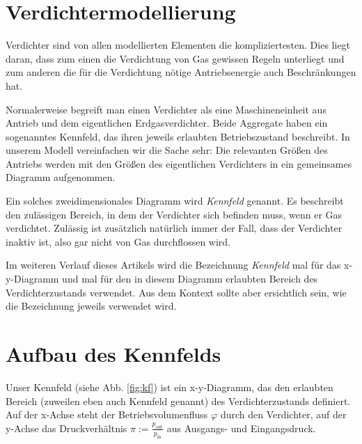 \documentclass{article}
\begin{document}
\section*{Verdichtermodellierung}

Verdichter sind von allen modellierten Elementen die kompliziertesten. Dies liegt daran, dass zum einen die Verdichtung von Gas gewissen Regeln unterliegt und zum anderen die für die Verdichtung nötige Antriebsenergie auch Beschränkungen hat. 

Normalerweise begreift man einen Verdichter als eine Maschineneinheit aus Antrieb und dem eigentlichen Erdgasverdichter. Beide Aggregate haben ein sogenanntes Kennfeld, das ihren jeweils erlaubten Betriebszustand beschreibt. In unserem Modell vereinfachen wir die Sache sehr: Die relevanten Größen des Antriebs werden mit den Größen des eigentlichen Verdichters in ein gemeinsames Diagramm aufgenommen.

Ein solches zweidimensionales Diagramm wird {\em Kennfeld} genannt. Es beschreibt den zulässigen Bereich, in dem der Verdichter sich befinden muss, wenn er Gas verdichtet. Zulässig ist zusätzlich natürlich immer der Fall, dass der Verdichter inaktiv ist, also gar nicht von Gas durchflossen wird.

Im weiteren Verlauf dieses Artikels wird die Bezeichnung  {\em Kennfeld} mal für das x-y-Diagramm und mal für den in diesem Diagramm erlaubten Bereich des Verdichterzustands verwendet. Aus dem Kontext sollte aber ersichtlich sein, wie die Bezeichnung jeweils verwendet wird.


\section{Aufbau des Kennfelds}
Unser Kennfeld (siehe Abb. \ref{fig:kf}) ist ein x-y-Diagramm, das den erlaubten Bereich (zuweilen eben auch Kennfeld genannt) des Verdichterzustands definiert. Auf der x-Achse steht der Betriebsvolumenfluss $\varphi$ durch den Verdichter, auf der y-Achse das Druckverhältnis $\pi:=\frac{p_{\text{out}}}{p_{\text{in}}}$ aus Ausgangs- und Eingangsdruck.

\end{document}
